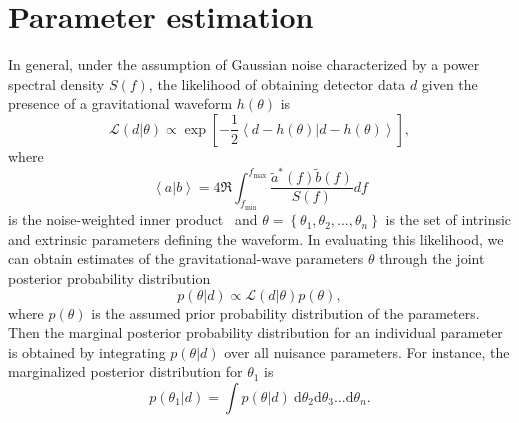 \section{Parameter estimation}\label{sec:eos_meas_pe}

In general, under the assumption of Gaussian noise characterized by a power spectral density $S(f)$, the likelihood of obtaining detector data $d$ given the presence of a gravitational waveform $h(\theta)$ is
\begin{equation}
    \mathcal{L}(d|\theta)\propto\exp\left[-\frac{1}{2}\left<d-h(\theta)|d-h(\theta)\right>\right],
\end{equation}
where
\begin{equation}
    \left<a|b\right>=4\mathfrak{R}\int_{f_{\mathrm{min}}}^{f_{\mathrm{max}}}\frac{\tilde{a}^{*}(f)\tilde{b}(f)}{S(f)}df
\end{equation}
is the noise-weighted inner product~\cite{Finn:1992xs,Chernoff:1993th} and $\theta= \left\{ \theta_{1},\theta_{2},\ldots,\theta_{n} \right\}$ is the set of intrinsic and extrinsic parameters defining the waveform.
In evaluating this likelihood, we can obtain estimates of the gravitational-wave parameters $\theta$ through the joint posterior probability distribution
\begin{equation}
    p(\theta|d)\propto\mathcal{L}(d|\theta)p(\theta),
\end{equation}
where $p(\theta)$ is the assumed prior probability distribution of the parameters. Then the marginal posterior probability distribution for an individual parameter is obtained by integrating $p(\theta|d)$ over all nuisance parameters. For instance, the marginalized posterior distribution for $\theta_{1}$ is
\begin{equation}
    p(\theta_{1}|d)=\int p(\theta|d)~\mathrm{d}\theta_{2}\mathrm{d}\theta_{3}\ldots\mathrm{d}\theta_{n}.
\end{equation}

